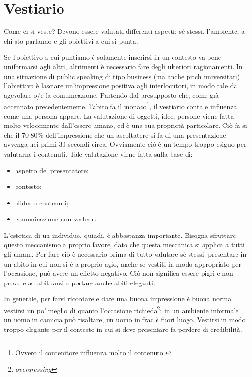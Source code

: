 \section{Vestiario}

Come ci si veste? Devono essere valutati differenti aspetti: sé stessi,
l'ambiente, a chi sto parlando e gli obiettivi a cui si punta.

Se l'obiettivo a cui puntiamo è solamente inserirsi in un contesto va bene
uniformarsi agli altri, altrimenti è necessario fare degli ulteriori
ragionamenti. In una situazione di public speaking di tipo business (ma anche
pitch universitari) l'obiettivo è lasciare un'impressione positiva agli
interlocutori, in modo tale da agevolare o/e la comunicazione. Partendo
dal presupposto che, come già accennato precedentemente, l'abito fa il
monaco\footnote{Ovvero il contenitore influenza molto il contenuto.}, il
vestiario conta e influenza come una persona appare. La valutazione di oggetti,
idee, persone viene fatta molto velocemente dall'essere umano, ed è una sua
proprietà particolare. Ciò fa si che il 70-80\% dell'impressione che
un ascoltatore si fa di una presentazione avvenga nei primi 30 secondi circa.
Ovviamente ciò è un tempo troppo esiguo per valutarne i contenuti. Tale
valutazione viene fatta sulla base di:
\begin{itemize}
\item aspetto del presentatore;
\item contesto;
\item slides o contenuti;
\item comunicazione non verbale.
\end{itemize}

L'estetica di un individuo, quindi, è abbastanza importante. Bisogna sfruttare
questo meccanismo a proprio favore, dato che questa meccanica si applica a tutti
gli umani. Per fare ciò è necessario prima di tutto valutare sé stessi:
presentare in un abito in cui non si è a proprio agio, anche se vestiti in modo
appropriato per l'occasione, può avere un effetto negativo. Ciò non significa
essere pigri e non provare ad abituarsi a portare anche abiti eleganti.

In generale, per farsi ricordare e dare una buona impressione è buona norma
vestirsi un po' meglio di quanto l'occasione
richieda\footnote{\textit{overdressing}}: in un ambiente informale un uomo in
camicia può risaltare, un uomo in frac è fuori luogo. Vestirsi in modo troppo
elegante per il contesto in cui si deve presentare fa perdere di credibilità.

